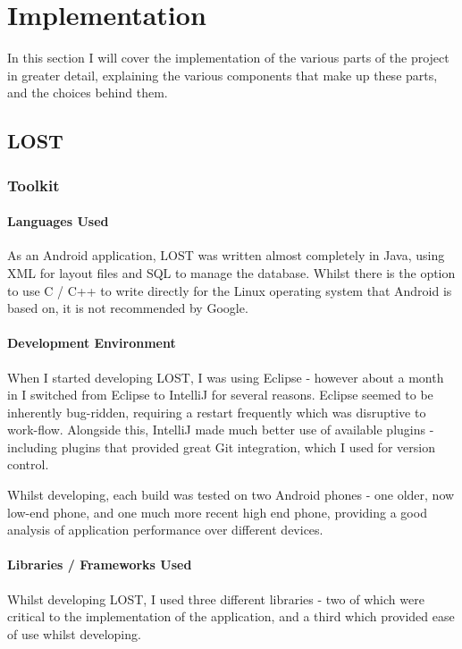 \documentclass[11pt]{informatics-report}
\begin{document}
\chapter{Implementation}

In this section I will cover the implementation of the various parts of the project in greater detail, explaining the various components that make up these parts, and the choices behind them.

\section{LOST}

\subsection{Toolkit}

\subsubsection{Languages Used}
As an Android application, LOST was written almost completely in Java, using XML for layout files and SQL to manage the database. Whilst there is the option to use C / C++ to write directly for the Linux operating system that Android is based on, it is not recommended by Google.

\subsubsection{Development Environment}

When I started developing LOST, I was using Eclipse - however about a month in I switched from Eclipse to IntelliJ for several reasons. Eclipse seemed to be inherently bug-ridden, requiring a restart frequently which was disruptive to work-flow. Alongside this, IntelliJ made much better use of available plugins - including plugins that provided great Git integration, which I used for version control. 

Whilst developing, each build was tested on two Android phones - one older, now low-end phone, and one much more recent high end phone, providing a good analysis of application performance over different devices.

\subsubsection{Libraries / Frameworks Used}

Whilst developing LOST, I used three different libraries - two of which were critical to the implementation of the application, and a third which provided ease of use whilst developing. 
\end{document}
